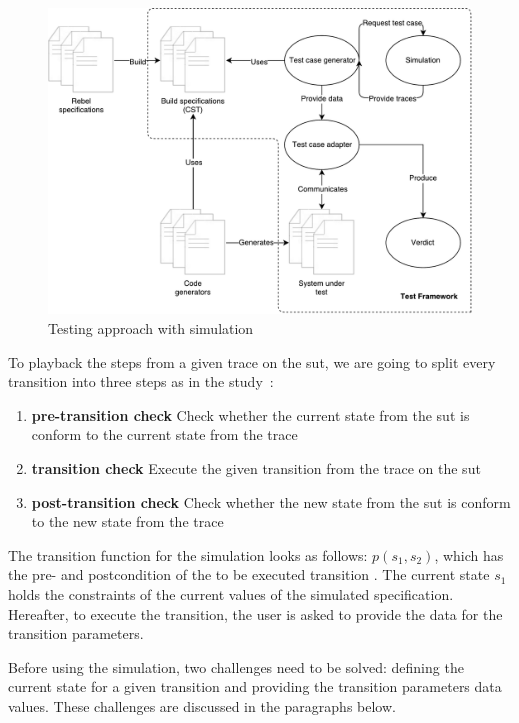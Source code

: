 \begin{figure}[h!]
  \centering
  \includegraphics[width=\linewidth{}]{figures/simulation-diagram.pdf}
  \caption{Testing approach with simulation}\label{fig:simulation-testing}
\end{figure}
\FloatBarrier

To playback the steps from a given trace on the \gls{sut}, we are going to split every
transition into three steps as in the
study~\cite[p.~6]{stoel_storm_vinju_bosman_2016}:
\begin{enumerate}
\item \textbf{pre-transition check} Check whether the current state from the \gls{sut}
is conform to the current state from the trace
\item \textbf{transition check} Execute the given transition from the trace on
the \gls{sut}
\item \textbf{post-transition check} Check whether the new state from the \gls{sut} is
conform to the new state from the trace
\end{enumerate}

The transition function for the simulation looks as follows: $p(s_{1}, s_{2})$,
which has the pre- and postcondition of the to be executed transition
\cite[p.~6]{stoel_storm_vinju_bosman_2016}. The current state $s_{1}$ holds the
constraints of the current values of the simulated specification. Hereafter, to
execute the transition, the user is asked to provide the data for the transition
parameters.

Before using the simulation, two challenges need to be solved: defining the
current state for a given transition and providing the transition parameters
data values. These challenges are discussed in the paragraphs below.

